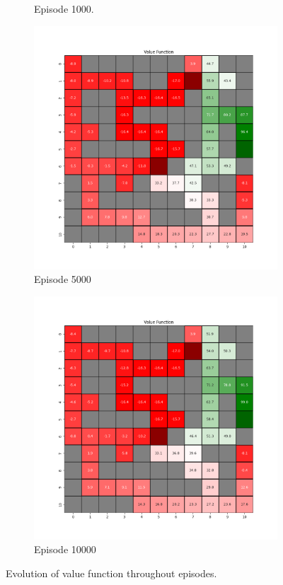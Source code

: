 \documentclass{assignment}
\begin{document}
\begin{figure}[H]
\begin{subfigure}{0.3\textwidth}
    \caption{Episode 1000.}
    \end{subfigure}\hfill
    \begin{subfigure}{0.3\textwidth}
        \includegraphics[width=\textwidth]{figures/value_q/default/value_function_alpha_0.1_gamma_0.95_epsilon_0.2_iteration_5000.png}
    \caption{Episode 5000}
    \end{subfigure}\hfill
    \begin{subfigure}{0.3\textwidth}
        \includegraphics[width=\textwidth]{figures/value_q/default/value_function_alpha_0.1_gamma_0.95_epsilon_0.2_iteration_10000.png}
    \caption{Episode 10000}
    \end{subfigure}
    \caption{Evolution of value function throughout episodes.}
    \label{fig:default_q_learning_value}
\end{figure}
\end{document}
